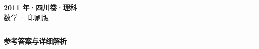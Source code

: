 \documentclass[zihao=5, a4paper]{ctexart}
\begin{document}
\begin{center}
  {\Large\bfseries 2011 年·四川卷·理科}\\[4pt]
  {\large 数学 · 印刷版}
\end{center}
\medskip
{}

\par\bigskip\hrule\bigskip
{}
\begin{center}{\large\bfseries 参考答案与详细解析}\end{center}
\smallskip

\end{document}
